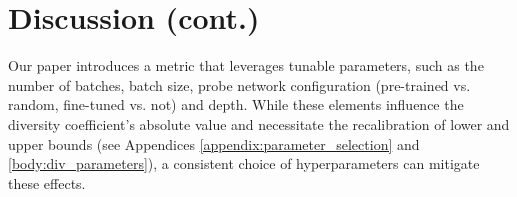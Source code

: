 \documentclass[10pt]{article} %
\begin{document}
\section{Discussion (cont.)}
\label{appendix:discussion_cont}

Our paper introduces a metric that leverages tunable parameters, such as the number of batches, batch size, probe network configuration (pre-trained vs. random, fine-tuned vs. not) and depth. 
While these elements influence the diversity coefficient's absolute value and necessitate the recalibration of lower and upper bounds (see Appendices \ref{appendix:parameter_selection} and \ref{body:div_parameters}), a consistent choice of hyperparameters can mitigate these effects. 
\end{document}
